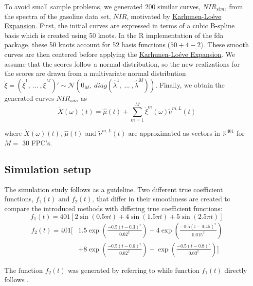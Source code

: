 \documentclass[11pt,twoside,a4paper]{article}
\begin{document}
	To avoid small sample problems, we generated 200 similar curves, $NIR_{sim}$, from the spectra of the gasoline data set, $NIR$, motivated by \hyperlink{KL}{Karhunen-Lo\'{e}ve Expansion}. First, the initial curves are expressed in terms of a  cubic B-spline basis which is created using 50 knots. In the R implementation of the fda package, these 50 knots account for 52 basis functions ($50+4-2$). These smooth curves are then centered before applying the \hyperlink{KL}{Karhunen-Lo\'{e}ve Expansion}. We assume that the scores follow a normal distribution, so the new realizations for the scores are drawn from a multivariate normal distribution $\mathring{\xi} = \left(\mathring{\xi}^{1},\: \dots \:, \mathring{\xi}^{M}\right)' \sim \mathcal{N}(0_M, \; diag(\hat{\lambda}^1,\: \dots\:, \hat{\lambda}^M))$. Finally, we obtain the generated curves $NIR_{sim}$ as
	\begin{equation}
		\mathring{X}(\omega)(t) = \hat{\mu}(t) + \sum_{m = 1}^{M} \mathring{\xi}^m(\omega) \tilde{\nu}^{m,L}(t)
	\end{equation}
	
	where $\mathring{X}(\omega)(t)$, $\hat{\mu}(t)$ and $\tilde{\nu}^{m,L}(t)$  are approximated as vectors in $\mathbb{R}^{401}$ for $M =$ 30 FPC's.
    
    \subsection{Simulation setup}
	The simulation study follows \cite{Reiss_2007b} as a guideline. Two different true coefficient functions,  $f_1(t)$ and  $f_2(t)$, that differ in their smoothness are created to compare the introduced methods with differing true coefficient functions:
	\begin{equation}
    	f_1(t) = 401 \left[ 2\sin(0.5\pi t) + 4\sin(1.5 \pi t) + 5\sin(2.5 \pi t) \right]
    \end{equation}
    \begin{equation}
    	\begin{split}
    		f_2(t) = 401  \Bigg[ & 1.5 \exp{\left(\frac{-0.5(t-0.3)^2}{0.02^2}\right)} - 4 \exp{\left(\frac{-0.5(t-0.45)^2}{0.015^2}\right)} \\
    				 & + 8 \exp{\left(\frac{-0.5(t-0.6)^2}{0.02^2}\right)} -  \exp{\left(\frac{-0.5(t-0.8)^2}{0.03^2}\right)} \Bigg]
    	\end{split}
    \end{equation}
    
    The function $f_2(t)$ was generated by referring to \cite{cardot_bumpyfunction_2002} while function $f_1(t)$ directly follows \cite{Reiss_2007b}. 
\end{document}
